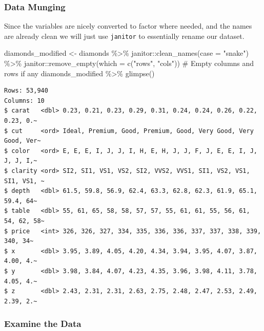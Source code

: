 \documentclass[
  letterpaper,
  DIV=11,
  numbers=noendperiod,
  oneside]{scrartcl}
\newenvironment{Shaded}{\begin{snugshade}}{\end{snugshade}}
\newcommand{\AttributeTok}[1]{\textcolor[rgb]{0.40,0.45,0.13}{#1}}
\newcommand{\CommentTok}[1]{\textcolor[rgb]{0.37,0.37,0.37}{#1}}
\newcommand{\FunctionTok}[1]{\textcolor[rgb]{0.28,0.35,0.67}{#1}}
\newcommand{\NormalTok}[1]{\textcolor[rgb]{0.00,0.23,0.31}{#1}}
\newcommand{\OtherTok}[1]{\textcolor[rgb]{0.00,0.23,0.31}{#1}}
\newcommand{\SpecialCharTok}[1]{\textcolor[rgb]{0.37,0.37,0.37}{#1}}
\newcommand{\StringTok}[1]{\textcolor[rgb]{0.13,0.47,0.30}{#1}}
\begin{document}
\subsubsection{Data Munging}

Since the variables are nicely converted to factor where needed, and the
names are already clean we will just use \texttt{janitor} to essentially
rename our dataset.

\begin{Shaded}
\begin{Highlighting}[]
\NormalTok{diamonds\_modified }\OtherTok{\textless{}{-}}\NormalTok{ diamonds }\SpecialCharTok{\%\textgreater{}\%}
\NormalTok{  janitor}\SpecialCharTok{::}\FunctionTok{clean\_names}\NormalTok{(}\AttributeTok{case =} \StringTok{"snake"}\NormalTok{) }\SpecialCharTok{\%\textgreater{}\%}
\NormalTok{  janitor}\SpecialCharTok{::}\FunctionTok{remove\_empty}\NormalTok{(}\AttributeTok{which =} \FunctionTok{c}\NormalTok{(}\StringTok{"rows"}\NormalTok{, }\StringTok{"cols"}\NormalTok{)) }\CommentTok{\# Empty columns and rows if any}
\NormalTok{diamonds\_modified }\SpecialCharTok{\%\textgreater{}\%} \FunctionTok{glimpse}\NormalTok{()}
\end{Highlighting}
\end{Shaded}

\begin{verbatim}
Rows: 53,940
Columns: 10
$ carat   <dbl> 0.23, 0.21, 0.23, 0.29, 0.31, 0.24, 0.24, 0.26, 0.22, 0.23, 0.~
$ cut     <ord> Ideal, Premium, Good, Premium, Good, Very Good, Very Good, Ver~
$ color   <ord> E, E, E, I, J, J, I, H, E, H, J, J, F, J, E, E, I, J, J, J, I,~
$ clarity <ord> SI2, SI1, VS1, VS2, SI2, VVS2, VVS1, SI1, VS2, VS1, SI1, VS1, ~
$ depth   <dbl> 61.5, 59.8, 56.9, 62.4, 63.3, 62.8, 62.3, 61.9, 65.1, 59.4, 64~
$ table   <dbl> 55, 61, 65, 58, 58, 57, 57, 55, 61, 61, 55, 56, 61, 54, 62, 58~
$ price   <int> 326, 326, 327, 334, 335, 336, 336, 337, 337, 338, 339, 340, 34~
$ x       <dbl> 3.95, 3.89, 4.05, 4.20, 4.34, 3.94, 3.95, 4.07, 3.87, 4.00, 4.~
$ y       <dbl> 3.98, 3.84, 4.07, 4.23, 4.35, 3.96, 3.98, 4.11, 3.78, 4.05, 4.~
$ z       <dbl> 2.43, 2.31, 2.31, 2.63, 2.75, 2.48, 2.47, 2.53, 2.49, 2.39, 2.~
\end{verbatim}

\subsubsection{\texorpdfstring{ Examine the
Data}{ Examine the Data}}\label{examine-the-data}
\end{document}
